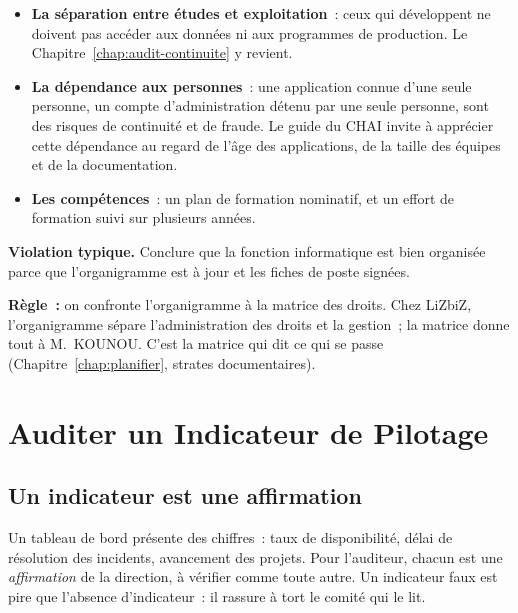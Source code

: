 \begin{itemize}
    \item \textbf{La séparation entre études et exploitation}~: ceux qui
          développent ne doivent pas accéder aux données ni aux programmes
          de production. Le Chapitre~\ref{chap:audit-continuite} y revient.
    \item \textbf{La dépendance aux personnes}~: une application connue
          d'une seule personne, un compte d'administration détenu par une
          seule personne, sont des risques de continuité et de fraude. Le
          guide du CHAI invite à apprécier cette dépendance au regard de
          l'âge des applications, de la taille des équipes et de la
          documentation.
    \item \textbf{Les compétences}~: un plan de formation nominatif, et un
          effort de formation suivi sur plusieurs années.
\end{itemize}

\begin{boxalert}
\textbf{Violation typique.} Conclure que la fonction informatique est bien
organisée parce que l'organigramme est à jour et les fiches de poste
signées.

\smallskip
\textbf{Règle~:} on confronte l'organigramme à la matrice des droits. Chez
LiZbiZ, l'organigramme sépare l'administration des droits et la gestion~;
la matrice donne tout à M.~KOUNOU. C'est la matrice qui dit ce qui se
passe (Chapitre~\ref{chap:planifier}, strates documentaires).
\end{boxalert}

\section{Auditer un Indicateur de Pilotage}
\label{sec:c13-indicateurs}

\subsection{Un indicateur est une affirmation}

Un tableau de bord présente des chiffres~: taux de disponibilité, délai de
résolution des incidents, avancement des projets. Pour l'auditeur, chacun
est une \emph{affirmation} de la direction, à vérifier comme toute autre.
Un indicateur faux est pire que l'absence d'indicateur~: il rassure à tort
le comité qui le lit.

